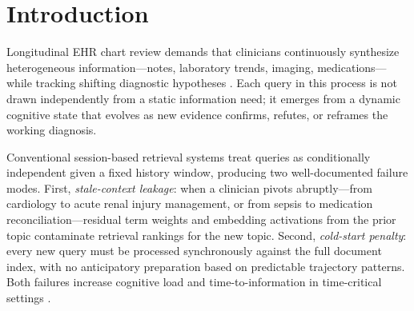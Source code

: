 \documentclass[11pt]{article}
\begin{document}
\begin{abstract}
\textbf{Results.} GDT demonstrated the strongest latency reduction among all four conditions (GDT: 127.5~ms vs.\ TF-IDF control: 184.0~ms, a 30.7\% reduction, $p < 0.001$, $d = -4.55$), driven by confidence-scaled optimal-control prefetching. CMA achieved a 23.8\% latency reduction relative to control ($p < 0.001$, $d = -3.91$); the two sparse baselines were statistically indistinguishable ($p = 0.68$). GDT showed the largest reduction in simulated cognitive load (69.8 vs.\ 71.6, $d = -0.55$, $p = 0.003$). Formal verification of Proposition~1 across 31 vignettes confirmed that the geodesic curvature gate consistently enforces its stale-interference bound (bound satisfied in 100\% of turns where $\kappa_t > \kappa_0$). The M/M/c model projects that GDT's latency reduction translates to a 4.5-minute reduction in mean patient processing time per shift during peak-acuity periods with 10 concurrent reviewers.

\textbf{Conclusions.} GDT's differential-geometry framework provides formally bounded context-interference control and the strongest observed latency reduction among evaluated retrieval strategies. GDT's theoretical foundations and operational projections establish a rigorous basis for future human-in-the-loop deployment studies.
\end{abstract}

\section{Introduction}
\label{sec:intro}

Longitudinal EHR chart review demands that clinicians continuously synthesize heterogeneous information---notes, laboratory trends, imaging, medications---while tracking shifting diagnostic hypotheses \citep{topol2019}. Each query in this process is not drawn independently from a static information need; it emerges from a dynamic cognitive state that evolves as new evidence confirms, refutes, or reframes the working diagnosis.

Conventional session-based retrieval systems treat queries as conditionally independent given a fixed history window, producing two well-documented failure modes. First, \emph{stale-context leakage}: when a clinician pivots abruptly---from cardiology to acute renal injury management, or from sepsis to medication reconciliation---residual term weights and embedding activations from the prior topic contaminate retrieval rankings for the new topic. Second, \emph{cold-start penalty}: every new query must be processed synchronously against the full document index, with no anticipatory preparation based on predictable trajectory patterns. Both failures increase cognitive load and time-to-information in time-critical settings \citep{croskerry2003}.
\end{document}
